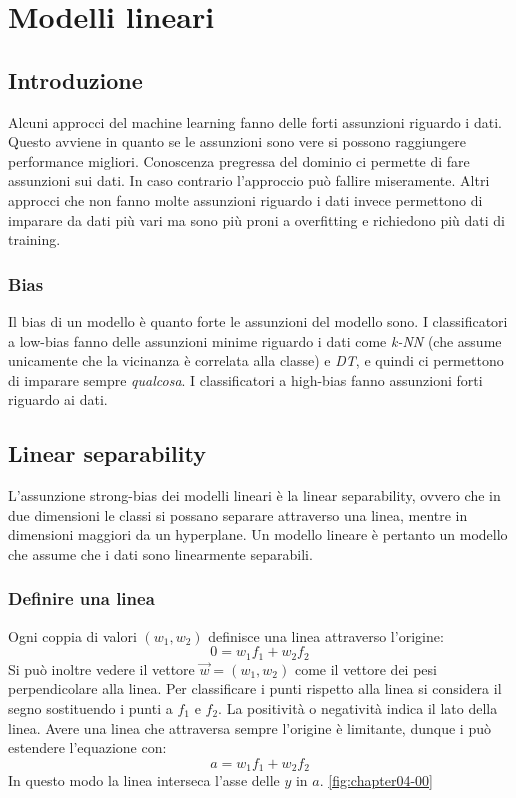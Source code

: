 \chapter{Modelli lineari}

\section{Introduzione}
Alcuni approcci del machine learning fanno delle forti assunzioni riguardo i dati.
Questo avviene in quanto se le assunzioni sono vere si possono raggiungere performance migliori. 
Conoscenza pregressa del dominio ci permette di fare assunzioni sui dati.
In caso contrario l'approccio pu\`o fallire miseramente.
Altri approcci che non fanno molte assunzioni riguardo i dati invece permettono di imparare da dati pi\`u vari ma sono pi\`u proni a overfitting e richiedono pi\`u dati di training.

	\subsection{Bias}
	Il bias di un modello \`e quanto forte le assunzioni del modello sono.
	I classificatori a low-bias fanno delle assunzioni minime riguardo i dati come \emph{k-NN} (che assume unicamente che la vicinanza \`e correlata alla classe) e \emph{DT}, e quindi ci permettono di imparare sempre \emph{qualcosa}.
	I classificatori a high-bias fanno assunzioni forti riguardo ai dati.
	
\section{Linear separability}
L'assunzione strong-bias dei modelli lineari \`e la linear separability, ovvero che in due dimensioni le classi si possano separare attraverso una linea, mentre in dimensioni maggiori da un hyperplane.
Un modello lineare \`e pertanto un modello che assume che i dati sono linearmente separabili. 
	
	\subsection{Definire una linea}
	Ogni coppia di valori $(w_1,w_2)$ definisce una linea attraverso l'origine:
	$$0=w_1f_1+w_2f_2$$
	Si pu\`o inoltre vedere il vettore $\overrightarrow{w}=(w_1, w_2)$ come il vettore dei pesi perpendicolare alla linea.
	Per classificare i punti rispetto alla linea si considera il segno sostituendo i punti a $f_1$ e $f_2$.
	La positivit\`a o negativit\`a indica il lato della linea.
	Avere una linea che attraversa sempre l'origine è limitante, dunque i pu\`o estendere l'equazione con:
	$$a=w_1f_1+w_2f_2$$
	In questo modo la linea interseca l'asse delle $y$ in $a$. \ref{fig:chapter04-00}
	
